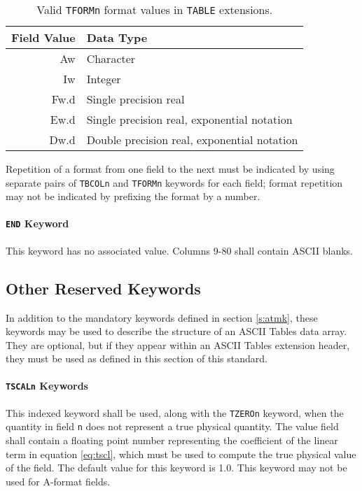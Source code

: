 \begin{table}[htpb]
\begin{center}
 \begin{tabular}{rl} \\
    Field Value  & Data Type                                   \\ \hline
           Aw    &  Character                                  \\
           Iw    &  Integer                                    \\
           Fw.d  &  Single precision real                       \\
           Ew.d  &  Single precision real, exponential notation \\
           Dw.d  &  Double precision real, exponential notation \\
 \end{tabular}
\end{center}
\caption{Valid {\tt TFORMn} format values in {\tt TABLE} extensions.}
\label{t:tabF}
\end{table}

 Repetition of a format from one field to 
 the next must be indicated by using separate pairs 
 of {\tt TBCOLn} 
 and {\tt TFORMn} keywords for each field; format repetition 
 may not be indicated by prefixing the format by a number.
  
   \paragraph{{\tt END} Keyword}
 This keyword has no associated value.  Columns 9-80
 shall contain ASCII blanks.
  
 \subsection{Other Reserved Keywords}
 \label{s:atork}
  In addition to the mandatory keywords 
  defined in section \ref{s:atmk},
  these keywords may be used to describe the structure of an
  ASCII Tables data array. They are optional, but if they
  appear within an ASCII Tables extension header, they must
  be used as defined in this section of this standard. 

   \paragraph{{\tt TSCALn} Keywords}
 This indexed keyword shall be used, along with the {\tt TZEROn}
 keyword, when the quantity in field {\tt n} does not
 represent a true physical quantity.  The value
 field shall contain a floating point number
 representing the coefficient of the linear term in 
 equation \ref{eq:tscl}, which must be used 
 to compute the true physical value of
 the field.  The default value for this keyword is 1.0.
 This keyword may not be used for A-format fields.

